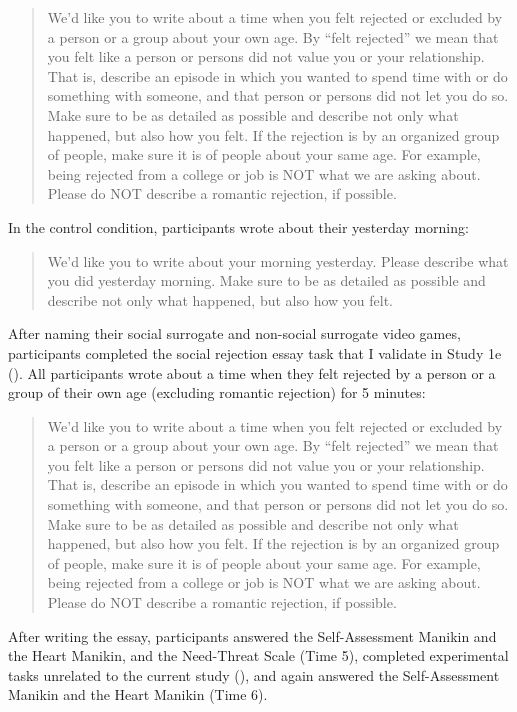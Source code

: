 \documentclass[
]{udthesis}
\begin{document}
\begin{quote}
We'd like you to write about a time when you felt rejected or excluded
by a person or a group about your own age. By ``felt rejected'' we mean
that you felt like a person or persons did not value you or your
relationship. That is, describe an episode in which you wanted to
spend time with or do something with someone, and that person or
persons did not let you do so. Make sure to be as detailed as possible
and describe not only what happened, but also how you felt. If the
rejection is by an organized group of people, make sure it is of
people about your same age. For example, being rejected from a college
or job is NOT what we are asking about. Please do NOT describe a
romantic rejection, if possible.
\end{quote}

In the control condition, participants wrote about their yesterday
morning:

\begin{quote}
We'd like you to write about your morning yesterday. Please describe
what you did yesterday morning. Make sure to be as detailed as
possible and describe not only what happened, but also how you felt.
\end{quote}

After naming their social surrogate and non-social surrogate video
games, participants completed the social rejection essay task that I
validate in Study 1e (). All participants
wrote about a time when they felt rejected by a person or a group of
their own age (excluding romantic rejection) for 5 minutes:

\begin{quote}
We'd like you to write about a time when you felt rejected or excluded
by a person or a group about your own age. By ``felt rejected'' we mean
that you felt like a person or persons did not value you or your
relationship. That is, describe an episode in which you wanted to
spend time with or do something with someone, and that person or
persons did not let you do so. Make sure to be as detailed as possible
and describe not only what happened, but also how you felt. If the
rejection is by an organized group of people, make sure it is of
people about your same age. For example, being rejected from a college
or job is NOT what we are asking about. Please do NOT describe a
romantic rejection, if possible.
\end{quote}

After writing the essay, participants answered the Self-Assessment
Manikin and the Heart Manikin, and the Need-Threat Scale (Time 5),
completed experimental tasks unrelated to the current study (), and again
answered the Self-Assessment Manikin and the Heart Manikin (Time 6).
\end{document}
